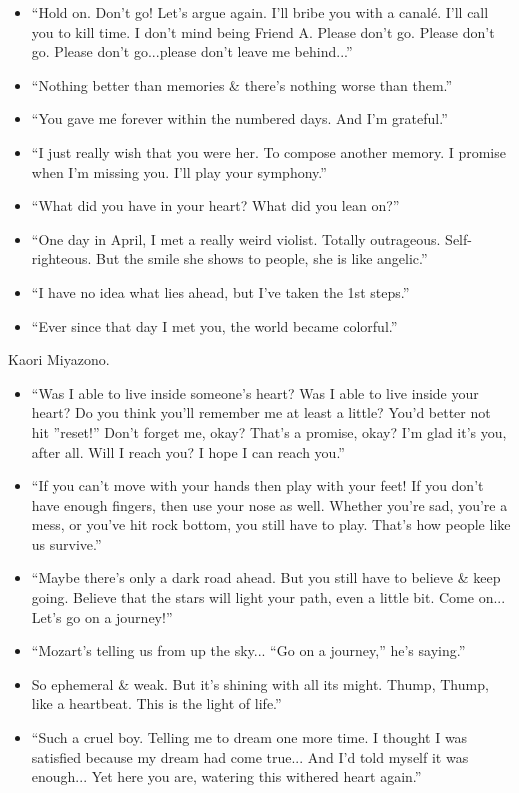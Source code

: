 \documentclass{article}
\begin{document}
\begin{enumerate}
\begin{itemize}
    	\item ``Hold on. Don't go! Let's argue again. I'll bribe you with a canalé. I'll call you to kill time. I don't mind being Friend A. Please don't go. Please don't go. Please don't go...please don't leave me behind...''
    	\item ``Nothing better than memories \& there's nothing worse than them.''
    	\item ``You gave me forever within the numbered days. And I'm grateful.''
    	\item ``I just really wish that you were her. To compose another memory. I promise when I'm missing you. I'll play your symphony.''
    	\item ``What did you have in your heart? What did you lean on?''
    	\item ``One day in April, I met a really weird violist. Totally outrageous. Self-righteous. But the smile she shows to people, she is like angelic.''
    	\item ``I have no idea what lies ahead, but I've taken the 1st steps.''
    	\item ``Ever since that day I met you, the world became colorful.''
    \end{itemize}
    {\sc Kaori Miyazono.}
    \begin{itemize}
    	\item ``Was I able to live inside someone's heart? Was I able to live inside your heart? Do you think you'll remember me at least a little? You'd better not hit ''reset!'' Don't forget me, okay? That's a promise, okay? I'm glad it's you, after all. Will I reach you? I hope I can reach you.''
    	\item ``If you can't move with your hands then play with your feet! If you don't have enough fingers, then use your nose as well. Whether you're sad, you're a mess, or you've hit rock bottom, you still have to play. That's how people like us survive.''
    	\item ``Maybe there's only a dark road ahead. But you still have to believe \& keep going. Believe that the stars will light your path, even a little bit. Come on... Let's go on a journey!''
    	\item ``Mozart's telling us from up the sky... ``Go on a journey,'' he's saying.''
    	\item So ephemeral \& weak. But it's shining with all its might. Thump, Thump, like a heartbeat. This is the light of life.''
    	\item ``Such a cruel boy. Telling me to dream one more time. I thought I was satisfied because my dream had come true... And I'd told myself it was enough... Yet here you are, watering this withered heart again.''

\end{itemize}
\end{enumerate}
\end{document}
